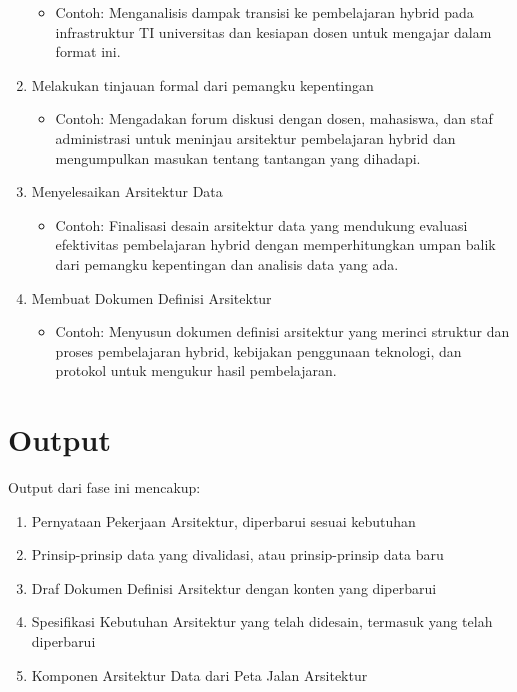 \begin{enumerate}
	\begin{itemize}
		\item Contoh: Menganalisis dampak transisi ke pembelajaran hybrid pada infrastruktur TI universitas dan kesiapan dosen untuk mengajar dalam format ini.
	\end{itemize}
	\item Melakukan tinjauan formal dari pemangku kepentingan
	\begin{itemize}
		\item Contoh: Mengadakan forum diskusi dengan dosen, mahasiswa, dan staf administrasi untuk meninjau arsitektur pembelajaran hybrid dan mengumpulkan masukan tentang tantangan yang dihadapi.
	\end{itemize}
	\item Menyelesaikan Arsitektur Data
	\begin{itemize}
		\item Contoh: Finalisasi desain arsitektur data yang mendukung evaluasi efektivitas pembelajaran hybrid dengan memperhitungkan umpan balik dari pemangku kepentingan dan analisis data yang ada.
	\end{itemize}
	\item Membuat Dokumen Definisi Arsitektur
	\begin{itemize}
		\item Contoh: Menyusun dokumen definisi arsitektur yang merinci struktur dan proses pembelajaran hybrid, kebijakan penggunaan teknologi, dan protokol untuk mengukur hasil pembelajaran.
	\end{itemize}
\end{enumerate}


\section{Output}
Output dari fase ini mencakup:
\begin{enumerate}
	\item Pernyataan Pekerjaan Arsitektur, diperbarui sesuai kebutuhan
	\item Prinsip-prinsip data yang divalidasi, atau prinsip-prinsip data baru
	\item Draf Dokumen Definisi Arsitektur dengan konten yang diperbarui
	\item Spesifikasi Kebutuhan Arsitektur yang telah didesain, termasuk yang telah diperbarui
	\item Komponen Arsitektur Data dari Peta Jalan Arsitektur
\end{enumerate}


